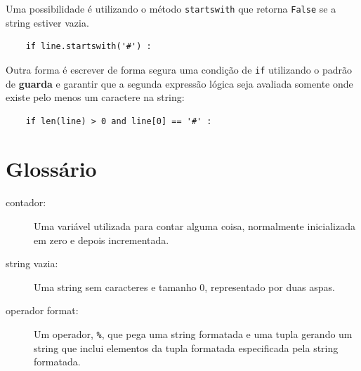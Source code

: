 {%

Uma possibilidade é utilizando o método {\tt startswith} que retorna
{\tt False} se a string estiver vazia.

\beforeverb
\begin{verbatim}
    if line.startswith('#') :
\end{verbatim}
\afterverb
%


Outra forma é escrever de forma segura uma condição de {\tt if} utilizando o
padrão de {\bf guarda} e garantir que a segunda expressão lógica seja avaliada
somente onde existe pelo menos um caractere na string:

\beforeverb
\begin{verbatim}
    if len(line) > 0 and line[0] == '#' :
\end{verbatim}
\afterverb
%

\section{Glossário}

\begin{description}

\item[contador:] Uma variável utilizada para contar alguma coisa, normalmente
	inicializada em zero e depois incrementada.

\item[string vazia:] Uma string sem caracteres e tamanho 0, representado por
	duas aspas.

\item[operador format:] Um operador, {\tt \%}, que pega uma string formatada
	e uma tupla gerando um string que inclui elementos da tupla formatada
	especificada pela string formatada.


\end{description}}
